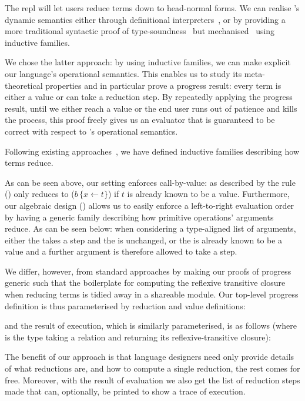 The \Velo{} \acs*{repl} will let users reduce terms down to head-normal forms.
%
We can realise \Velo{}'s dynamic semantics either through definitional
interpreters~\cite{10.1145/3093333.3009866,Augustsson1999edt},
or by providing a more traditional syntactic proof of
type-soundness~\cite{DBLP:journals/iandc/WrightF94}
but mechanised~\cite[Part 2: Properties]{plfa22.08} using inductive families.

We chose the latter approach: by using inductive families, we can make explicit
our language's operational semantics.
%
This enables us to study its meta-theoretical properties and in particular prove
a progress result: every term is either a value or can take a reduction step.
%
By repeatedly applying the progress result, until we either reach a value or the end
user runs out of patience and kills the process, this proof freely gives us an
evaluator that is guaranteed to be correct with respect to \Velo{}'s operational
semantics.

Following existing approaches~\cite[Part 2: Properties]{plfa22.08}, we have defined
inductive families describing how terms reduce.


As can be seen above, our setting enforces call-by-value:
as described by the rule 
() only reduces to
($b \, \lbrace x \leftarrow t \rbrace$)
if $t$ is already known to be a value.
%
Furthermore, our algebraic design () allows
us to easily enforce a left-to-right evaluation order by having a generic
family describing how primitive operations' arguments reduce.
%
As can be seen below: when considering a type-aligned list of arguments,
either the  takes a step and the  is unchanged,
or the  is already known to be a value and a further argument
is therefore allowed to take a step.


We differ, however, from standard approaches by making our proofs of progress generic
such that the boilerplate for computing the reflexive transitive closure
when reducing terms is tidied away in a shareable module.
%
Our top-level progress definition is thus parameterised by reduction and value definitions:


\noindent
and the result of execution, which is similarly parameterised, is as follows
(where  is the type taking a relation and returning its
reflexive-transitive closure):


The benefit of our approach is that language designers need only provide details of
what reductions are,
and how to compute a single reduction, the rest comes for free.
%
Moreover, with the result of evaluation we also get the list of reduction steps made that can, optionally, be printed to show a trace of execution.

